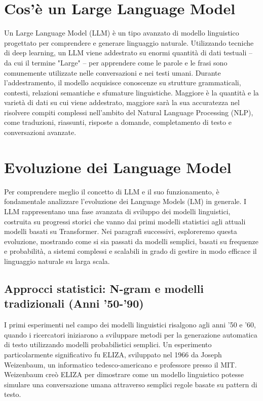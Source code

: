 \documentclass[target=mst,aauheader=,style=]{thud}
\begin{document}
\section{Cos’è un Large Language Model}
Un Large Language Model (LLM) è un tipo avanzato di modello linguistico progettato per comprendere e generare linguaggio naturale. Utilizzando tecniche di deep learning, un LLM viene addestrato su enormi quantità di dati testuali – da cui il termine "Large" – per apprendere come le parole e le frasi sono comunemente utilizzate nelle conversazioni e nei testi umani. Durante l'addestramento, il modello acquisisce conoscenze su strutture grammaticali, contesti, relazioni semantiche e sfumature linguistiche. Maggiore è la quantità e la varietà di dati su cui viene addestrato, maggiore sarà la sua accuratezza nel risolvere compiti complessi nell’ambito del Natural Language Processing (NLP), come traduzioni, riassunti, risposte a domande, completamento di testo e conversazioni avanzate.\cite{naveed_2024}

\section{Evoluzione dei Language Model}
Per comprendere meglio il concetto di LLM e il suo funzionamento, è fondamentale analizzare l'evoluzione dei Language Models (LM) in generale. I LLM rappresentano una fase avanzata di sviluppo dei modelli linguistici, costruita su progressi storici che vanno dai primi modelli statistici agli attuali modelli basati su Transformer. Nei paragrafi successivi, esploreremo questa evoluzione, mostrando come si sia passati da modelli semplici, basati su frequenze e probabilità, a sistemi complessi e scalabili in grado di gestire in modo efficace il linguaggio naturale su larga scala.

\subsection{Approcci statistici: N-gram e modelli tradizionali (Anni '50-'90)}
I primi esperimenti nel campo dei modelli linguistici risalgono agli anni ’50 e ’60, quando i ricercatori iniziarono a sviluppare metodi per la generazione automatica di testo utilizzando modelli probabilistici semplici. Un esperimento particolarmente significativo fu ELIZA, sviluppato nel 1966 da Joseph Weizenbaum, un informatico tedesco-americano e professore presso il MIT. Weizenbaum creò ELIZA per dimostrare come un modello linguistico potesse simulare una conversazione umana attraverso semplici regole basate su pattern di testo.
\end{document}
